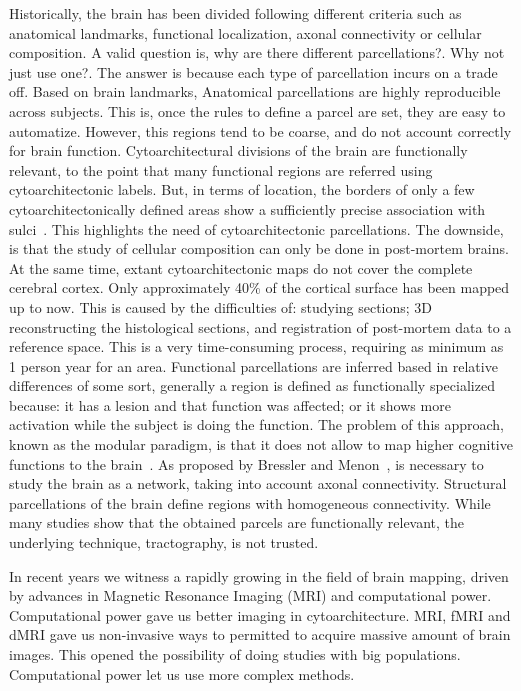 Historically, the brain has been divided following different criteria such as
anatomical landmarks, functional localization, axonal connectivity or
cellular composition. A valid question is, why are there different parcellations?.
Why not just use one?. The answer is because each type of parcellation incurs
on a trade off. Based on brain landmarks, Anatomical parcellations are highly
reproducible across subjects. This is, once the rules to define a parcel are
set, they are easy to automatize. However, this regions tend to be coarse,
and do not account correctly for brain function. Cytoarchitectural divisions
of the brain are functionally relevant, to the point that many functional
regions are referred using cytoarchitectonic labels. But, in terms of location,
the borders of only a few cytoarchitectonically defined areas show a 
sufficiently precise association with sulci~\cite{Amunts2007}. This highlights
the need of cytoarchitectonic parcellations. The downside, is that the study
of cellular composition can only be done in post-mortem brains. At the same time,
extant cytoarchitectonic maps do not cover the complete cerebral cortex. 
Only approximately 40\% of the cortical surface has been mapped up to now. 
This is caused by the difficulties of: studying sections; 3D reconstructing the
histological sections, and registration of post-mortem data to a reference space.
This is a very time-consuming process, requiring as minimum as 1 person year for
an area. Functional parcellations are inferred based in relative differences of
some sort, generally a region is defined as functionally specialized because:
it has a lesion and that function was affected; or it shows more activation 
while the subject is doing the function. The problem of this approach, known
as the modular paradigm, is that it does not allow to map higher cognitive
functions to the brain~\cite{Fuster2000}. As proposed by Bressler and Menon~\cite{Bressler2010},
is necessary to study the brain as a network, taking into account axonal
connectivity. Structural parcellations of the brain define regions with homogeneous
connectivity. While many studies show that the obtained parcels are functionally
relevant, the underlying technique, tractography, is not trusted.

In recent years we witness a rapidly growing in the field
of brain mapping, driven by advances in Magnetic Resonance Imaging (MRI) and
computational power. Computational
power gave us better imaging in cytoarchitecture. MRI, fMRI and
dMRI gave us non-invasive ways to permitted to acquire massive amount
of brain images. This opened the possibility of doing studies with big populations.
Computational power let us use more complex methods. 




